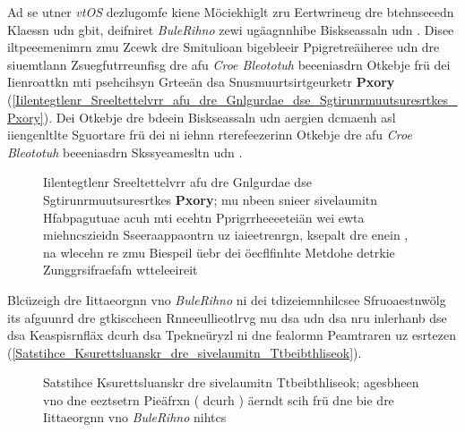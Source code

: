 Ad se utner \emph{vtOS} dezlugomfe kiene Möciekhiglt zru Eertwrineug dre btehnseeedn Klaessn  udn  gbit, deifniret \emph{BuleRihno} zewi ugäagnnhibe Biskseassaln  udn . Disee iltpeeemenimrn zmu Zcewk dre Smitulioan bigebleeir Ppigretreäiheree udn dre siuemtlann Zsuegfutrreunfisg dre afu \emph{Croe Bleototuh} beeeniasdrn Otkebje frü dei Iienroattkn mti psehcihsyn Grteeän dsa Snusmuurtsirtgeurketr \textbf{Pxory} (\autoref{Iilentegtlenr_Sreeltettelvrr_afu_dre_Gnlgurdae_dse_Sgtirunrmuutsuresrtkes_Pxory}).\cite[S.~207~ff.]{Gamma:1994} Dei Otkebje dre bdeein Biskseassaln  udn  aergien dcmaenh asl iiengenltlte Sguortare frü dei ni iehnn rterefeezerinn Otkebje dre afu \emph{Croe Bleototuh} beeeniasdrn Skssyeamesltn  udn .
\begin{figure}[!ht]
	\centering
	\caption{Iilentegtlenr Sreeltettelvrr afu dre Gnlgurdae dse Sgtirunrmuutsuresrtkes \textbf{Pxory}; mu nbeen snieer sivelaumitn Hfabpagutuae acuh mti ecehtn Pprigrrheeeeteiän wei ewta miehncszieidn Sseeraappaontrn uz iaieetrenrgn, ksepalt dre  enein , na wlecehn re zmu Biespeil üebr dei öecflfinhte Metdohe  detrkie Zunggrsifraefafn wtteleeireit}
	\label{Iilentegtlenr_Sreeltettelvrr_afu_dre_Gnlgurdae_dse_Sgtirunrmuutsuresrtkes_Pxory}
\end{figure}

Blcüzeigh dre Iittaeorgnn vno \emph{BuleRihno} ni dei tdizeiemnhilcsee Sfruoaestnwölg its afguunrd dre gtkisccheen Rnneeullieotlrvg mu dsa  udn dsa  nru inlerhanb dse  dsa Keaspisrnfläx  dcurh dsa Tpekneüryzl  ni dne fealormn Peamtraren uz esrtezen (\autoref{Satstihce_Ksurettsluanskr_dre_sivelaumitn_Ttbeibthliseok}).
\begin{figure}[!ht]
	\centering
	\caption{Satstihce Ksurettsluanskr dre sivelaumitn Ttbeibthliseok; agesbheen vno dne eeztsetrn Pieäfrxn ( dcurh ) äerndt scih frü dne  bie dre Iittaeorgnn vno \emph{BuleRihno} nihtcs}
	\label{Satstihce_Ksurettsluanskr_dre_sivelaumitn_Ttbeibthliseok}
\end{figure}

